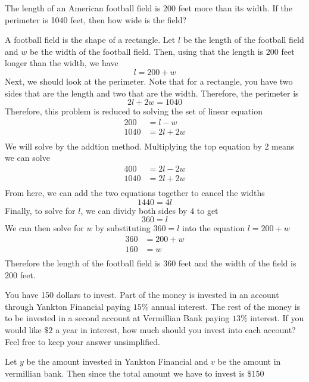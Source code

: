 \documentclass[addpoints,12pt]{exam}
\begin{document}
\begin{questions}
\question The length of an American football field is 200 feet more than its width. If the perimeter is 1040 feet, then how wide is the field? 
\begin{solution}
    A football field is the shape of a rectangle. Let $l$ be the length of the football field and $w$ be the width of the football field. Then, using that the length is $200$ feet longer than the width, we have 
		\[
			l = 200+w
		\]
Next, we should look at the perimeter. Note that for a rectangle, you have two sides that are the length and two that are the width. Therefore, the perimeter is 
\[
2l+2w= 1040
\]
Therefore, this problem is reduced to solving the set of linear equation 
\begin{align*}
	200 &  = l-w \\
	1040 & = 2l + 2w \\
\end{align*}
We will solve by the addtion method. Multiplying the top equation by 2 means we can solve 
\begin{align*}
	400 &  = 2l-2w \\
	1040 & = 2l + 2w \\
\end{align*}
From here, we can add the two equations together to cancel the widths 
\[1440 = 4l \]
Finally, to solve for $l$, we can dividy both sides by $4$ to get 
\[
360 = l
\]
We can then solve for $w$ by substituting $360 = l $ into the equation $l = 200 +w$
\begin{align*}
	360 & = 200 +w \\
	160 & = w \\
\end{align*}
Therefore the length of the football field is $360$ feet and the width of the field is $200 $ feet.

\end{solution}


\question You have 150 dollars to invest. Part of the money is invested in an account through Yankton Financial paying $15\%$ annual interest. The rest of the money is to be invested in a second account at Vermillian Bank paying $13\%$ interest. If you would like $\$2$ a year in interest, how much should you invest into each account? Feel free to keep your answer unsimplified. 

\begin{solution}
    Let $y$ be the amount invested in Yankton Financial and $v$ be the amount in vermillian bank. Then since the total amount we have to invest is $\$150$ 
\end{solution}


\end{questions}
\end{document}
